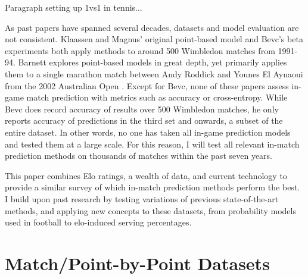 \documentclass[chapterprefix=false]{report}
\begin{document}
Paragraph setting up 1vs1 in tennis...

As past papers have spanned several decades, datasets and model evaluation are not consistent. Klaassen and Magnus' original point-based model and Bevc's beta experiments both apply methods to around 500 Wimbledon matches from 1991-94. Barnett explores point-based models in great depth, yet primarily applies them to a single marathon match between Andy Roddick and Younes El Aynaoui from the 2002 Australian Open \cite{Barnett2006}. Except for Bevc, none of these papers assess in-game match prediction with metrics such as accuracy or cross-entropy. While Bevc does record accuracy of results over 500 Wimbledon matches, he only reports accuracy of predictions in the third set and onwards, a subset of the entire dataset. In other words, no one has taken all in-game prediction models and tested them at a large scale. For this reason, I will test all relevant in-match prediction methods on thousands of matches within the past seven years.


This paper combines Elo ratings, a wealth of data, and current technology to provide a similar survey of which in-match prediction methods perform the best. I build upon past research by testing variations of previous state-of-the-art methods, and applying new concepts to these datasets, from probability models used in football to elo-induced serving percentages.
 
\section{Match/Point-by-Point Datasets}
 
\end{document}
